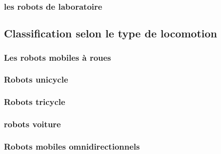 \subsubsection{les robots de laboratoire}

\subsection{Classification selon le type de locomotion}
\subsubsection{Les robots mobiles à roues}
\subsubsection{Robots unicycle}
\subsubsection{Robots tricycle}
\subsubsection{robots voiture}
\subsubsection{Robots mobiles omnidirectionnels}
